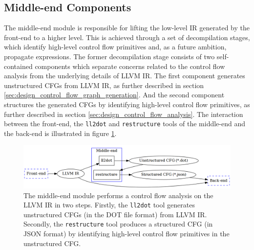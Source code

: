 


\subsection{Middle-end Components}
\label{sec:design_middle-end_components}

The middle-end module is responsible for lifting the low-level IR generated by the front-end to a higher level. This is achieved through a set of decompilation stages, which identify high-level control flow primitives and, as a future ambition, propagate expressions. The former decompilation stage consists of two self-contained components which separate concerns related to the control flow analysis from the underlying details of LLVM IR. The first component generates unstructured CFGs from LLVM IR, as further described in section \ref{sec:design_control_flow_graph_generation}. And the second component structures the generated CFGs by identifying high-level control flow primitives, as further described in section \ref{sec:design_control_flow_analysis}. The interaction between the front-end, the \texttt{ll2dot} and \texttt{restructure} tools of the middle-end and the back-end is illustrated in figure \ref{fig:middle-end}.

\begin{figure}[htbp]
	\begin{center}
		\includegraphics[width=\textwidth]{inc/middle-end.png}
		\caption{The middle-end module performs a control flow analysis on the LLVM IR in two steps. Firstly, the \texttt{ll2dot} tool generates unstructured CFGs (in the DOT file format) from LLVM IR. Secondly, the \texttt{restructure} tool produces a structured CFG (in JSON format) by identifying high-level control flow primitives in the unstructured CFG.}
		\label{fig:middle-end}
	\end{center}
\end{figure}




